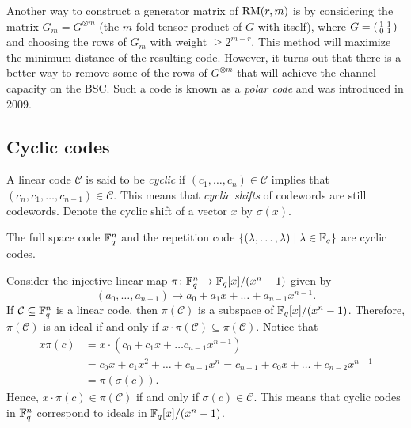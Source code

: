 \documentclass[../main.tex]{subfiles}
\begin{document}
Another way to construct a generator matrix of $\operatorname{RM}(r, m)$ is by considering the matrix $G_m = G^{\otimes m}$ (the $m$-fold tensor product of $G$ with itself), where $G = \begin{psmallmatrix}1 & 1 \\ 0 & 1\end{psmallmatrix}$ and choosing the rows of $G_m$ with weight $\geq 2^{m - r}$. This method will maximize the minimum distance of the resulting code. However, it turns out that there is a better way to remove some of the rows of $G^{\otimes m}$ that will achieve the channel capacity on the BSC. Such a code is known as a \emph{polar code} and was introduced in 2009.

\subsection{Cyclic codes}

A linear code $\mathcal{C}$ is said to be \emph{cyclic} if $(c_1, \dots, c_n) \in \mathcal{C}$ implies that $(c_n, c_1, \dots, c_{n-1}) \in \mathcal{C}$. This means that \emph{cyclic shifts} of codewords are still codewords. Denote the cyclic shift of a vector $x$ by $\sigma(x)$.

\begin{example}
The full space code $\mathbb{F}_q^n$ and the repetition code $\{(\lambda, \dots, \lambda) \mid \lambda \in \mathbb{F}_q \}$ are cyclic codes.
\end{example}

Consider the injective linear map $\pi \colon \mathbb{F}_q^n \to \mathbb{F}_q[x] / (x^n - 1)$ given by
\begin{equation*}
    (a_0, \dots, a_{n-1}) \mapsto a_0 + a_1x + \dots + a_{n-1}x^{n-1}.
\end{equation*}
If $\mathcal{C} \subseteq \mathbb{F}_q^n$ is a linear code, then $\pi(\mathcal{C})$ is a subspace of $\mathbb{F}_q[x] / (x^n - 1)$. Therefore, $\pi(\mathcal{C})$ is an ideal if and only if $x \cdot \pi(\mathcal{C}) \subseteq \pi(\mathcal{C})$. Notice that
\begin{align*}
    x \pi(c) &= x \cdot (c_0 + c_1x + \dots c_{n-1} x^{n-1}) \\
    &= c_0 x + c_1 x^2 + \dots + c_{n-1} x^n = c_{n-1} + c_0 x + \dots + c_{n-2} x^{n-1} \\
    &= \pi(\sigma(c)).
\end{align*}
Hence, $x \cdot \pi(c) \in \pi(\mathcal{C})$ if and only if $\sigma(c) \in \mathcal{C}$. This means that cyclic codes in $\mathbb{F}_q^n$ correspond to ideals in $\mathbb{F}_q[x] / (x^n - 1)$.
\end{document}
